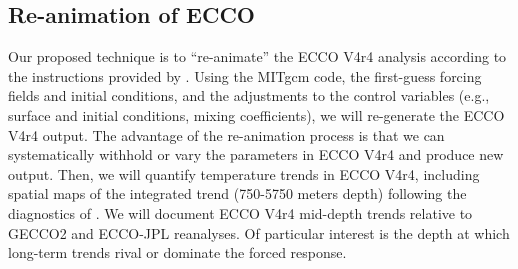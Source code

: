 \documentclass[authoryear,round,12pt]{article}
\begin{document}
\subsection{Re-animation of ECCO}
\label{sec:re-animation-ecco}

Our proposed technique is to ``re-animate'' the ECCO V4r4 analysis according to the instructions provided by \citet{Wang--2019:Instructions}. Using the MITgcm code, the first-guess forcing fields and initial conditions, and the adjustments to the control variables (e.g., surface and initial conditions, mixing coefficients), we will re-generate the ECCO V4r4 output. The advantage of the re-animation process is that we can systematically withhold or vary the parameters in ECCO V4r4 and produce new output. Then, we will quantify temperature trends in ECCO V4r4, including spatial maps of the integrated trend (750-5750 meters depth) following the diagnostics of \citet{Palmer-Roberts-2017:Ocean}. %
We will document ECCO V4r4 mid-depth trends relative to GECCO2 and ECCO-JPL reanalyses. Of particular interest is the depth at which long-term trends rival or dominate the forced response.  




\end{document}
